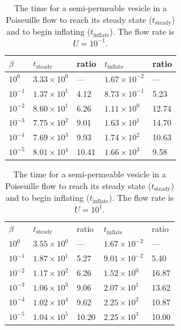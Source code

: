 \documentclass[9pt,twocolumn,twoside,lineno]{pnas-new}
\begin{document}
\begin{table}[htp]
  \centering
  \caption{\label{tbl:parabolicRelaxTimes1} The time for a
  semi-permeable vesicle in a Poiseuille flow to reach its steady state
  ($t_\mathrm{steady}$) and to begin inflating ($t_\mathrm{inflate}$).
  The flow rate is $U = 10^{-1}$.}
  \begin{tabular}{C{0.8cm}C{2cm}C{0.8cm}C{2cm}C{0.8cm}}
    $\beta$ & $t_\mathrm{steady}$ & ratio & $t_\mathrm{inflate}$ & ratio \\
    \midrule
    $10^{0}$  & $3.33 \times 10^{0}$ & ---  
              & $1.67 \times 10^{-2}$ & --- \\ 
    $10^{-1}$ & $1.37 \times 10^{1}$ & 4.12 & 
                $8.73 \times 10^{-1}$ & 5.23 \\
    $10^{-2}$ & $8.60 \times 10^{1}$ & 6.26 & 
                $1.11 \times 10^{0}$ & 12.74 \\
    $10^{-3}$ & $7.75 \times 10^{2}$ & 9.01 & 
                $1.63 \times 10^{1}$ & 14.70 \\
    $10^{-4}$ & $7.69 \times 10^{3}$ & 9.93 & 
                $1.74 \times 10^{2}$ & 10.63 \\
    $10^{-5}$ & $8.01 \times 10^{4}$ & 10.41 & 
                $1.66 \times 10^{3}$ & 9.58 \\
    \bottomrule
  \end{tabular}
\end{table}


\begin{table}[htp]
  \centering
  \caption{\label{tbl:parabolicRelaxTimes2} The time for a
  semi-permeable vesicle in a Poiseuille flow to reach its steady state
  ($t_\mathrm{steady}$) and to begin inflating ($t_\mathrm{inflate}$).
  The flow rate is $U = 10^{1}$.}
  \begin{tabular}{C{0.8cm}C{2cm}C{0.8cm}C{2cm}C{0.8cm}}
    \midrule
    $\beta$ & $t_\mathrm{steady}$ & ratio & $t_\mathrm{inflate}$ & ratio \\
    $10^{0}$  & $3.55 \times 10^{0}$ & ---  
              & $1.67 \times 10^{-2}$ & --- \\ 
    $10^{-1}$ & $1.87 \times 10^{1}$ & 5.27 & 
                $9.01 \times 10^{-2}$ & 5.40 \\
    $10^{-2}$ & $1.17 \times 10^{2}$ & 6.26 & 
                $1.52 \times 10^{0}$ & 16.87 \\
    $10^{-3}$ & $1.06 \times 10^{3}$ & 9.06 & 
                $2.07 \times 10^{1}$ & 13.62 \\
    $10^{-4}$ & $1.02 \times 10^{4}$ & 9.62 & 
                $2.25 \times 10^{2}$ & 10.87 \\
    $10^{-5}$ & $1.04 \times 10^{5}$ & 10.20 & 
                $2.25 \times 10^{3}$ & 10.00 \\
    \bottomrule
  \end{tabular}
\end{table}
\end{document}
